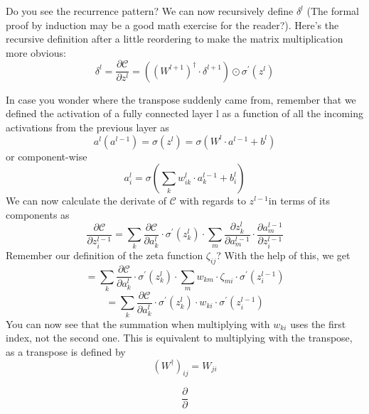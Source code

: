 \documentclass[]{scrartcl}
\begin{document}
Do you see the recurrence pattern? We can now recursively define \(\delta^l\) (The formal proof by induction may be a good math exercise for the reader?). Here's the recursive definition after a little reordering to make the matrix multiplication more obvious:
\begin{equation}
\delta^{l} = \frac{\partial\mathcal{C}}{\partial z^{l} } =
 ((W^{l+1})^\dagger \cdot \delta^{l+1}) \odot \sigma^\prime(z^l)
\end{equation}

In case you wonder where the transpose suddenly came from, remember that we defined the  activation of a fully connected layer l as a function of all the incoming activations from the previous layer as
\begin{equation}
a^l(a^{l-1}) = \sigma(z^l) = \sigma( W^l \cdot a^{l-1} + b^l )
\end{equation}
or component-wise
\begin{equation}
a^l_i = \sigma (\sum_k w^l_{ik} \cdot a^{l-1}_k + b^l_i)
\end{equation}
We can now calculate the derivate of \( \mathcal{C} \) with regards to \( z^{l-1} \)in terms of its components as
\begin{equation}
\frac{ \partial \mathcal{C}} {\partial z^{l-1}_i} =  
\sum_k  \frac{\partial \mathcal{C}}{\partial a^l_k} \cdot   \sigma^\prime (z^l_k) \cdot \sum_m \frac{\partial z_k^l}{\partial a^{l-1}_m} \cdot \frac{\partial a^{l-1}_m}{\partial z_i^{l-1}}
\end{equation}
Remember our definition of the zeta function \( \zeta_{ij} \)? With the help of this, we get
\begin{equation}
=  \sum_k \frac{\partial \mathcal{C}}{\partial a^l_k} \cdot   \sigma^\prime (z^l_k) \cdot \sum_m w_{km} \cdot \zeta_{mi} \cdot \sigma^\prime(z_i^{l-1})
\end{equation}
\begin{equation}
=  \sum_k \frac{\partial \mathcal{C}}{\partial a^l_k} \cdot   \sigma^\prime (z^l_k) \cdot w_{ki} \cdot \sigma^\prime(z_i^{l-1})
\end{equation}
You can now see that the summation when multiplying with \( w_{ki} \) uses the first index, not the second one. This is equivalent to multiplying with the transpose, as a transpose is defined by
\begin{equation}
(W^\dagger)_{ij} = W_{ji}
\end{equation}


\begin{equation}
\frac{\partial }{\partial }
\end{equation}
\end{document}
